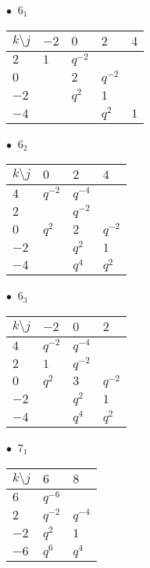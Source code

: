 %
\begin{minipage}{\linewidth}
$\bullet\ $ $6_{1}$ \vspace{0.5em} \\
\begin{tabular}{l|llll}
$k \setminus j$ & $-2$ & $0$ & $2$ & $4$ \\
\hline
$2$ & $1$ & $q^{-2}$ &  &  \\
$0$ &  & $2$ & $q^{-2}$ &  \\
$-2$ &  & $q^{2}$ & $1$ &  \\
$-4$ &  &  & $q^{2}$ & $1$ \\
\end{tabular}
\vspace{2em}
\end{minipage}
%
\begin{minipage}{\linewidth}
$\bullet\ $ $6_{2}$ \vspace{0.5em} \\
\begin{tabular}{l|lll}
$k \setminus j$ & $0$ & $2$ & $4$ \\
\hline
$4$ & $q^{-2}$ & $q^{-4}$ &  \\
$2$ &  & $q^{-2}$ &  \\
$0$ & $q^{2}$ & $2$ & $q^{-2}$ \\
$-2$ &  & $q^{2}$ & $1$ \\
$-4$ &  & $q^{4}$ & $q^{2}$ \\
\end{tabular}
\vspace{2em}
\end{minipage}
%
\begin{minipage}{\linewidth}
$\bullet\ $ $6_{3}$ \vspace{0.5em} \\
\begin{tabular}{l|lll}
$k \setminus j$ & $-2$ & $0$ & $2$ \\
\hline
$4$ & $q^{-2}$ & $q^{-4}$ &  \\
$2$ & $1$ & $q^{-2}$ &  \\
$0$ & $q^{2}$ & $3$ & $q^{-2}$ \\
$-2$ &  & $q^{2}$ & $1$ \\
$-4$ &  & $q^{4}$ & $q^{2}$ \\
\end{tabular}
\vspace{2em}
\end{minipage}
%
\begin{minipage}{\linewidth}
$\bullet\ $ $7_{1}$ \vspace{0.5em} \\
\begin{tabular}{l|ll}
$k \setminus j$ & $6$ & $8$ \\
\hline
$6$ & $q^{-6}$ &  \\
$2$ & $q^{-2}$ & $q^{-4}$ \\
$-2$ & $q^{2}$ & $1$ \\
$-6$ & $q^{6}$ & $q^{4}$ \\
\end{tabular}
\vspace{2em}
\end{minipage}

